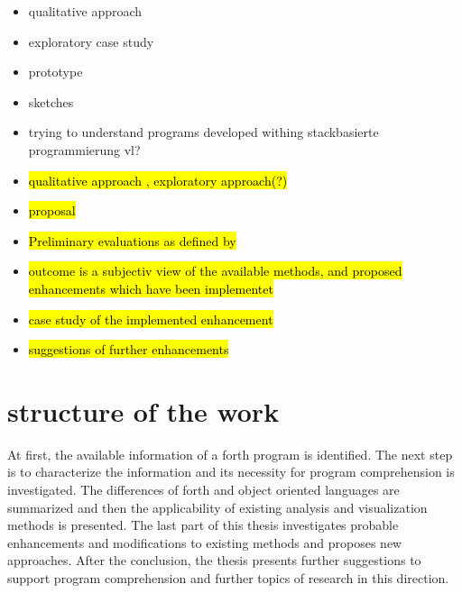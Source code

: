 \begin{itemize}
\item qualitative approach
\item exploratory case study
\item prototype
\item sketches
\item trying to understand programs developed withing stackbasierte programmierung vl?

\item \hl{qualitative approach , exploratory approach(?)}
\item \hl{proposal}
\item \hl{Preliminary evaluations as defined by} \cite{Cornelissen:2009:SSP:1638616.1639301}
\item \hl{outcome is a subjectiv view of the available methods, and proposed enhancements which have been implementet}
\item \hl{case study of the implemented enhancement}
\item \hl{suggestions of further enhancements}
\end{itemize}

\section{structure of the work}

At first, the available information of a forth program is identified. The next step is to characterize the information and its necessity for program comprehension is investigated. The differences of forth and object oriented languages are summarized and then the applicability of existing analysis and visualization methods is presented.
The last part of this thesis investigates probable enhancements and modifications to existing methods and proposes new approaches.
After the conclusion, the thesis presents further suggestions to support program comprehension and further topics of research in this direction.
